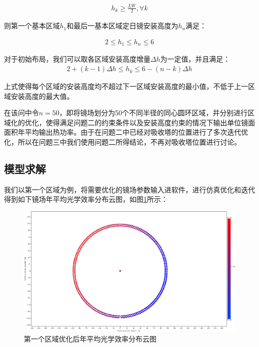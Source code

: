 \documentclass[withoutpreface,bwprint]{cumcmthesis} %
\begin{document}
\begin{eqnarray}
h_k\ge\frac{LW}{2} ,\forall k
\end{eqnarray}

则第一个基本区域$h_1$和最后一基本区域定日镜安装高度为$h_n$满足：

\begin{eqnarray}
2\le h_1\le h_n\le6
\end{eqnarray}

对于初始布局，我们可以取各区域安装高度增量$\Delta h$为一定值，并且满足：
\begin{eqnarray}
2+(k-1)\Delta h\le h_{k}\le6-(n-k)\Delta h
\end{eqnarray}

上式使得每个区域的安装高度均不超过下一区域安装高度的最小值，不低于上一区域安装高度的最大值。

在该问中令$n=50$，即将镜场划分为50个不同半径的同心圆环区域，并分别进行区域化的优化，使得满足问题二的约束条件以及安装高度约束的情况下输出单位镜面面积年平均输出热功率。由于在问题二中已经对吸收塔的位置进行了多次迭代优化，所以在问题三中我们使用问题二所得结论，不再对吸收塔位置进行讨论。
\subsection{模型求解}
我们以第一个区域为例，将需要优化的镜场参数输入进软件，进行仿真优化和迭代得到如下镜场年平均光学效率分布云图，如图\ref{yt11}所示：
\begin{figure}[htbp]
\centering
\includegraphics[width=\textwidth]{figures/quan.png}
\caption{第一个区域优化后年平均光学效率分布云图}\label{yt11}
\end{figure}
\end{document}
